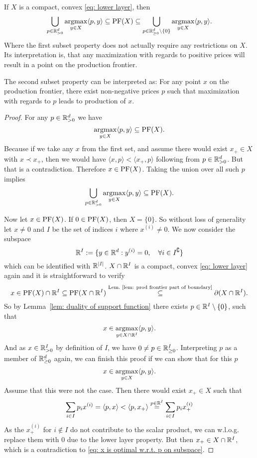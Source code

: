 \begin{theorem}
	If \(X\) is a compact, convex \ref{eq: lower layer}, then
	\[
		\bigcup_{p\in \mathbb{R}_{>0}^d} \operatorname*{argmax}_{y\in X}\langle p, y\rangle
		\subseteq \operatorname{PF}(X) \subseteq
		\bigcup_{p\in \mathbb{R}_{\ge 0}^d\setminus\{0\}}
		\operatorname*{argmax}_{y\in X}\langle p, y\rangle.
	\]
	Where the first subset property does not actually require any restrictions on
	\(X\). Its interpretation is, that any maximization with regards to positive
	prices will result in a point on the production frontier.

	The second subset property can be interpreted as: For any point \(x\) on the
	production frontier, there exist non-negative prices \(p\) such that
	maximization with regards to \(p\) leads to production of \(x\).
\end{theorem}
\begin{proof}
	For any \(p\in\mathbb{R}_{>0}^d\) we have
	\[
		\operatorname*{argmax}_{y\in X}\langle p, y\rangle \subseteq \operatorname{PF}(X).
	\]
	Because if we take any \(x\) from the first
	set, and assume there would exist \(x_+\in X\) with \(x\prec x_+\), then we
	would have \(\langle x, p\rangle < \langle x_+, p\rangle\) following from
	\(p\in \mathbb{R}_{>0}^d\). But that is a contradiction. Therefore
	\(x\in\operatorname{PF}(X)\). Taking the union over all such \(p\) implies
	\[
		\bigcup_{p\in \mathbb{R}_{>0}^d} \operatorname*{argmax}_{y\in X}\langle p, y\rangle \subseteq \operatorname{PF}(X).
	\]

	Now let \(x\in \operatorname{PF}(X)\). If \(0\in\operatorname{PF}(X)\), then \(X=\{0\}\). So without loss
	of generality let \(x\neq 0\) and \(I\) be the set of indices \(i\) where
	\(x^{(i)}\neq 0\). We now consider the subspace
	\[
		\mathbb{R}^I := \{y\in \mathbb{R}^d : y^{(i)} = 0, \quad \forall i \in I^\complement\}
	\]
	which can be identified with \(\mathbb{R}^{|I|}\). \(X\cap\mathbb{R}^I\) is a compact,
	convex \ref{eq: lower layer} again and it is straightforward to verify
	\[
		x\in \operatorname{PF}(X)\cap \mathbb{R}^I
		\subseteq \operatorname{PF}(X\cap \mathbb{R}^I)
		\overset{\text{Lem.~\ref{lem: prod frontier part of boundary}}}\subseteq
		\partial(X\cap\mathbb{R}^I).
	\]
	So by Lemma~\ref{lem: duality of support function} there exists \(p\in
	\mathbb{R}^I\setminus \{0\}\), such that 
	\begin{equation}
		\label{eq: x is optimal w.r.t. p on subspace}
		x\in \operatorname*{argmax}_{y\in X\cap\mathbb{R}^I} \langle p, y\rangle.
	\end{equation}
	And as \(x\in\mathbb{R}_{>0}^I\) by definition of \(I\), we have \(0\neq
	p\in\mathbb{R}_{\ge 0}^I\). Interpreting \(p\) as a member of \(\mathbb{R}_{\ge
	0}^d\) again, we can finish this proof if we can show that for this \(p\)
	\[
		x\in\operatorname*{argmax}_{y\in X}\langle p, y\rangle.
	\]
	Assume that this were not the case. Then there would exist \(x_+\in X\)
	such that
	\[
		\sum_{i\in I}p_i x^{(i)}
		= \langle p, x\rangle
		< \langle p, x_+\rangle
		\overset{p\in\mathbb{R}^I}= \sum_{i\in I} p_i x_+^{(i)}
	\]
	As the \(x^{(i)}_+\) for \(i\notin I\) do not contribute to the scalar product,
	we can w.l.o.g. replace them with \(0\) due to the lower layer property.
	But then \(x_+\in X\cap \mathbb{R}^I\), which is a contradiction to \eqref{eq: x
	is optimal w.r.t. p on subspace}.
\end{proof}


